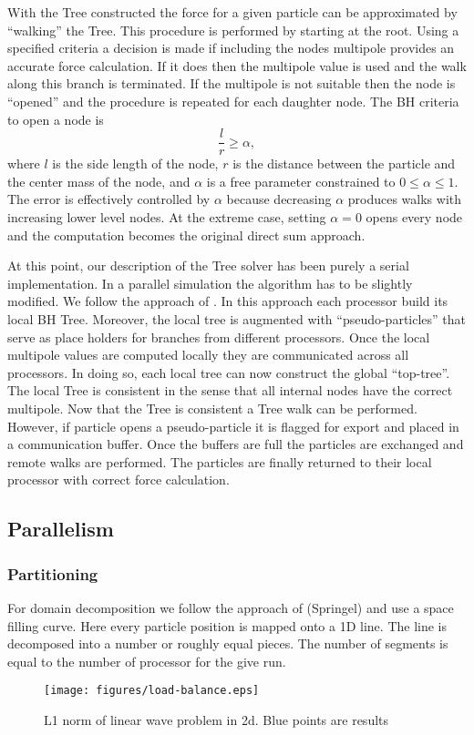 With the Tree constructed the force for a given particle can be approximated by ``walking'' the
Tree. This procedure is performed by starting at the root. Using a specified criteria a decision
is made if including the nodes multipole provides an accurate force calculation. If it does
then the multipole value is used and the walk along this branch is terminated. If the multipole 
is not suitable then the node is ``opened'' and the procedure is repeated for each daughter node.
The BH criteria to open a node is
\begin{equation}
\frac{l}{r} \ge \alpha,
\end{equation}
where $l$ is the side length of the node, $r$ is the distance between the particle and the center mass
of the node, and $\alpha$ is a free parameter constrained to $0 \le \alpha \le 1$. The error is 
effectively controlled by $\alpha$ because decreasing $\alpha$ produces walks with increasing lower
level nodes. At the extreme case, setting $\alpha=0$ opens every node and the computation becomes
the original direct sum approach.

At this point, our description of the Tree solver has been purely a serial implementation. In a parallel
simulation the algorithm has to be slightly modified. We follow the approach of \cite{Springel2005}. In
this approach each processor build its local BH Tree. Moreover, the local tree is augmented with
``pseudo-particles'' that serve as place holders for branches from different processors. Once the local
multipole values are computed locally they are communicated across all processors. In doing so, each
local tree can now construct the global ``top-tree''. The local Tree is consistent in the sense that all
internal nodes have the correct multipole. Now that the Tree is consistent a Tree walk can be performed.
However, if particle opens a pseudo-particle it is flagged for export and placed in a communication
buffer. Once the buffers are full the particles are exchanged and remote walks are performed. The
particles are finally returned to their local processor with correct force calculation.

\subsection{Parallelism}
\label{sec.parallel}
\subsubsection{Partitioning}
For domain decomposition we follow the approach of (Springel) and use
a space filling curve. Here every particle position is mapped onto a
1D line. The line is decomposed into a number or roughly equal pieces.
The number of segments is equal to the number of processor for the
give run.
\begin{figure}
    \begin{center}
        \texttt{[image: figures/load-balance.eps]}
        \caption{L1 norm of linear wave problem in 2d. Blue points are results}
    \end{center}
\end{figure}

